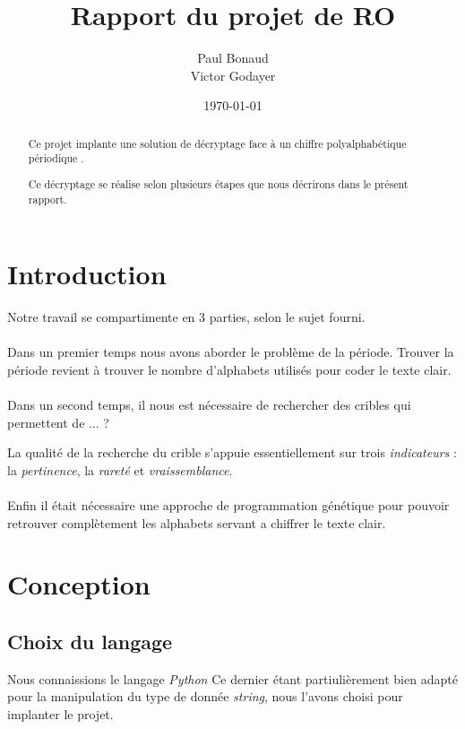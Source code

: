 \documentclass[a4paper, 11pt]{article}
\begin{document}
\title{Rapport du projet de RO}
\author{Paul Bonaud\\
  Victor Godayer}
\date\today

\maketitle

\begin{abstract}
  Ce projet implante une solution de décryptage face à un chiffre
  polyalphabétique périodique .

  Ce décryptage se réalise selon plusieurs étapes que nous décrirons
  dans le présent rapport.
\end{abstract}
\newpage
\tableofcontents
\newpage


\section{Introduction}
Notre travail se compartimente en 3 parties, selon le sujet fourni.

\paragraph{}
Dans un premier temps nous avons aborder le problème de la période.
Trouver la période revient à trouver le nombre d'alphabets utilisés pour
coder le texte clair.

\paragraph{}
Dans un second temps, il nous est nécessaire de rechercher des cribles
qui permettent de ... ?

La qualité de la recherche du crible s'appuie essentiellement sur
trois \textit{indicateurs} : la \textit{pertinence}, la
\textit{rareté} et \textit{vraissemblance}.

\paragraph{}
Enfin il était nécessaire une approche de programmation génétique pour
pouvoir retrouver complètement les alphabets servant a chiffrer le
texte clair.


\section{Conception}

\subsection{Choix du langage}
Nous connaissions le langage \textit{Python}
Ce dernier étant partiulièrement bien adapté pour la manipulation
du type de donnée \textit{string}, nous l'avons choisi pour implanter
le projet.
\end{document}
